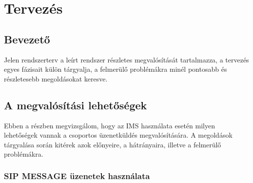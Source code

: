 

\section{Tervezés}

\subsection{Bevezető}

Jelen rendszerterv a leírt rendszer részletes megvalósítását
tartalmazza, a tervezés egyes fázisait külön tárgyalja, a felmerülő
problémákra minél pontosabb és részletesebb megoldásokat keresve.

\subsection{A megvalósítási lehetőségek}

Ebben a részben megvizsgálom, hogy az IMS használata esetén milyen lehetőségek vannak a csoportos üzenetküldés megvalósítására. A megoldások tárgyalása során kitérek azok előnyeire, a hátrányaira, illetve a felmerülő problémákra.

\subsubsection{SIP MESSAGE üzenetek használata}
\label{sec:sip_message}

